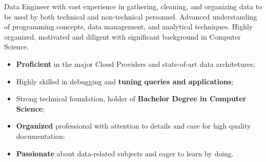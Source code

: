 \documentclass[10pt,a4paper]{gmelocv}
\begin{document}
\tagline{}


\makecvheader


\justifying
    Data Engineer with vast experience in gathering, cleaning, and organizing data to be used by both technical and non-technical personnel. Advanced understanding of programming concepts, data management, and analytical techniques. Highly organized, motivated and diligent with significant background in Computer Science.



\begin{itemize}
  \item \textbf{Proficient} in the major Cloud Providers and state-of-art data architetures;
  \item Highly skilled in debugging and \textbf{tuning queries and applications};
  \item Strong technical foundation, holder of \textbf{Bachelor Degree in Computer Science};
  \item \textbf{Organized} professional with attention to details and care for high quality documentation;
  \item \textbf{Passionate} about data-related subjects and eager to learn by doing.
\end{itemize}


\end{document}
